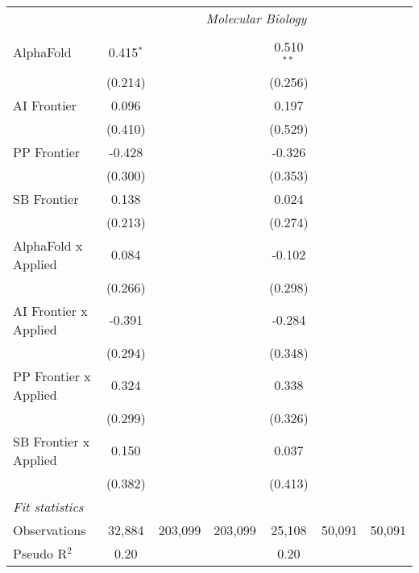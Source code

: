 \begin{tabular}{lcccccc}
 & \multicolumn{6}{c}{\textit{Molecular Biology}} \\ \\
   AlphaFold             & 0.415$^{*}$ &         &         & 0.510$^{**}$ &        &   \\   
                         & (0.214)     &         &         & (0.256)      &        &   \\   
   AI Frontier           & 0.096       &         &         & 0.197        &        &   \\   
                         & (0.410)     &         &         & (0.529)      &        &   \\   
   PP Frontier           & -0.428      &         &         & -0.326       &        &   \\   
                         & (0.300)     &         &         & (0.353)      &        &   \\   
   SB Frontier           & 0.138       &         &         & 0.024        &        &   \\   
                         & (0.213)     &         &         & (0.274)      &        &   \\   
   AlphaFold x Applied   & 0.084       &         &         & -0.102       &        &   \\   
                         & (0.266)     &         &         & (0.298)      &        &   \\   
   AI Frontier x Applied & -0.391      &         &         & -0.284       &        &   \\   
                         & (0.294)     &         &         & (0.348)      &        &   \\   
   PP Frontier x Applied & 0.324       &         &         & 0.338        &        &   \\   
                         & (0.299)     &         &         & (0.326)      &        &   \\   
   SB Frontier x Applied & 0.150       &         &         & 0.037        &        &   \\   
                         & (0.382)     &         &         & (0.413)      &        &   \\   
   \midrule
   \emph{Fit statistics}\\
   Observations          & 32,884      & 203,099 & 203,099 & 25,108       & 50,091 & 50,091\\  
   Pseudo R$^2$          & 0.20        &         &         & 0.20         &        & \\  
   

\end{tabular}
